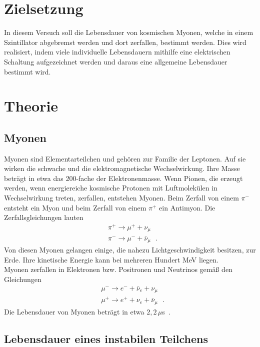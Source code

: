 



  \section{Zielsetzung}

    In diesem Versuch soll die Lebensdauer von kosmischen Myonen,
    welche in einem Szintillator abgebremst werden und dort zerfallen,
    bestimmt werden. Dies wird realisiert, indem viele individuelle Lebensdauern
    mithilfe eine elektrischen Schaltung
    aufgezeichnet werden und daraus eine allgemeine Lebensdauer bestimmt wird.


  \section{Theorie}

    \subsection{Myonen}

    Myonen sind Elementarteilchen und gehören zur Familie der Leptonen.
    Auf sie wirken die schwache und die elektromagnetische Wechselwirkung.
    Ihre Masse beträgt in etwa das 200-fache der Elektronenmasse.
    Wenn Pionen, die erzeugt werden, wenn energiereiche kosmische Protonen
    mit Luftmolekülen in Wechselwirkung treten, zerfallen, entstehen Myonen.
    Beim Zerfall von einem $\pi^-$ entsteht ein Myon und beim Zerfall von
    einem $\pi^+$ ein Antimyon. Die Zerfallsgleichungen lauten
    \begin{align*}
      &\pi^+ \to \mu^+ +\nu_{\mu}\\
      &\pi^- \to \mu^- +\bar{\nu}_{\mu}\,\,\,\,.
    \end{align*}
    Von diesen Myonen gelangen einige, die nahezu Lichtgeschwindigkeit
    besitzen, zur Erde. Ihre kinetische Energie kann bei mehreren Hundert MeV
    liegen. \\
    Myonen zerfallen in Elektronen bzw. Positronen und Neutrinos gemäß den Gleichungen
    \begin{align*}
      &\mu^- \to e^- +\bar{\nu}_e+\nu_{\mu}\\
      &\mu^+ \to e^+ +\nu_e +\bar{\nu}_{\mu}\,\,\,\,.
    \end{align*}
    Die Lebensdauer von Myonen beträgt in etwa $2,2\,\mu$s~\cite{pdg}.

    \subsection{Lebensdauer eines instabilen Teilchens}

